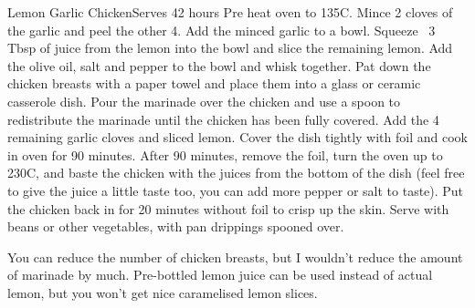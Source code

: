 \begin{recipe}{Lemon Garlic Chicken}{Serves 4}{2 hours}
Pre heat oven to 135C. Mince 2 cloves of the garlic and peel the other 4. 
Add the minced garlic to a bowl. Squeeze ~3 Tbsp of juice from the
lemon into the bowl and slice the remaining lemon. Add the olive oil,
salt and pepper to the bowl and whisk together.
Pat down the chicken breasts with a paper towel and place them into
a glass or ceramic casserole dish. Pour the marinade over the chicken
and use a spoon to redistribute the marinade until the chicken has been
fully covered. Add the 4 remaining garlic cloves and sliced lemon. 
Cover the dish tightly with foil and cook in oven for 90 minutes. 
After 90 minutes, remove the foil, turn the oven up to 230C, and baste
the chicken with the juices from the bottom of the dish (feel free to
give the juice a little taste too, you can add more pepper or salt 
to taste). Put the chicken back in for 20 minutes without foil
to crisp up the skin.
Serve with beans or other vegetables, with pan drippings spooned over.

You can reduce the number of chicken breasts, but I wouldn't reduce
the amount of marinade by much. Pre-bottled lemon juice can be used
instead of actual lemon, but you won't get nice caramelised lemon slices.
\end{recipe}